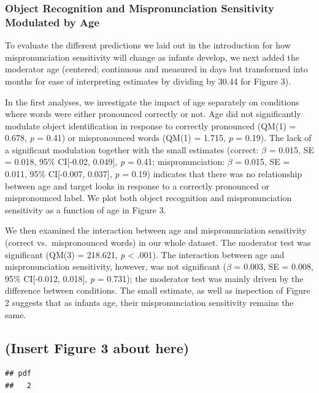 \documentclass[man]{apa6}
\theoremstyle{definition}
\theoremstyle{definition}
\theoremstyle{definition}
\theoremstyle{remark}
\begin{document}
\subsubsection{Object Recognition and Mispronunciation Sensitivity
Modulated by
Age}\label{object-recognition-and-mispronunciation-sensitivity-modulated-by-age}

To evaluate the different predictions we laid out in the introduction
for how mispronunciation sensitivity will change as infants develop, we
next added the moderator age (centered; continuous and measured in days
but transformed into months for ease of interpreting estimates by
dividing by 30.44 for Figure 3).

In the first analyses, we investigate the impact of age separately on
conditions where words were either pronounced correctly or not. Age did
not significantly modulate object identification in response to
correctly pronounced (QM(1) = 0.678, \emph{p} = 0.41) or mispronounced
words (QM(1) = 1.715, \emph{p} = 0.19). The lack of a significant
modulation together with the small estimates (correct: \(\beta\) =
0.015, SE = 0.018, 95\% CI{[}-0.02, 0.049{]}, \emph{p} = 0.41;
mispronunciation: \(\beta\) = 0.015, SE = 0.011, 95\% CI{[}-0.007,
0.037{]}, \emph{p} = 0.19) indicates that there was no relationship
between age and target looks in response to a correctly pronounced or
mispronounced label. We plot both object recognition and
mispronunciation sensitivity as a function of age in Figure 3.

We then examined the interaction between age and mispronunciation
sensitivity (correct vs.~mispronounced words) in our whole dataset. The
moderator test was significant (QM(3) = 218.621, \emph{p} \textless{}
.001). The interaction between age and mispronunciation sensitivity,
however, was not significant (\(\beta\) = 0.003, SE = 0.008, 95\%
CI{[}-0.012, 0.018{]}, \emph{p} = 0.731); the moderator test was mainly
driven by the difference between conditions. The small estimate, as well
as inspection of Figure 2 suggests that as infants age, their
mispronunciation sensitivity remains the same.

\subsection{(Insert Figure 3 about
here)}\label{insert-figure-3-about-here}

\begin{verbatim}
## pdf 
##   2
\end{verbatim}
\end{document}
